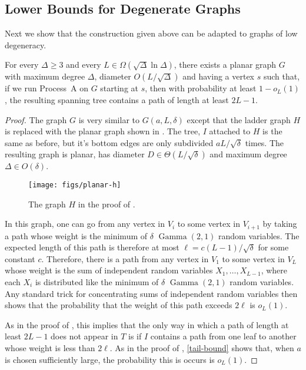 \documentclass[lotsofwhite]{patmorin}
\DeclareMathOperator{\gammarv}{Gamma}
\begin{document}
\subsection{Lower Bounds for Degenerate Graphs}

Next we show that the construction given above can be adapted to graphs
of low degeneracy.

\begin{thm}
  For every $\Delta\ge 3$ and every $L\in\Omega(\sqrt{\Delta}\ln\Delta)$,
  there exists a planar graph $G$ with maximum degree $\Delta$, diameter
  $O(L/\sqrt{\Delta})$ and having a vertex $s$ such that, if we run
  Process~A on $G$ starting at $s$, then with probability at least
  $1-o_L(1)$, the resulting spanning tree contains a path of length at
  least $2L-1$.
\end{thm}

\begin{proof}
  The graph $G$ is very similar to $G(a, L,\delta)$ except that the ladder
  graph $H$ is replaced with the planar graph shown in .
  The tree, $I$ attached to $H$ is the same as before, but it's bottom
  edges are only subdivided $aL/\sqrt{\delta}$ times.  The resulting
  graph is planar, has diameter $D\in\Theta(L/\sqrt{\delta})$ and maximum
  degree $\Delta\in O(\delta)$.

  \begin{figure}
    \begin{center}
      \texttt{[image: figs/planar-h]}
    \end{center}
    \caption{The graph $H$ in the proof of .}
  \end{figure}
 
  In this graph, one can go from any vertex in $V_i$ to some vertex in 
  $V_{i+1}$ by taking a path
  whose weight is the minimum of $\delta$ $\gammarv(2,1)$ random
  variables.  The expected length of this path is therefore at most
  $\ell=c(L-1)/\sqrt{\delta}$ for some constant $c$. Therefore, there is
  a path from any vertex in $V_1$ to some vertex in $V_L$ whose weight is
  the sum of independent random variables $X_1,\ldots,X_{L-1}$, where each
  $X_i$ is distributed like the minimum of $\delta$ $\gammarv(2,1)$ random
  variables. Any standard trick for concentrating sums of independent
  random variables then shows that the probability that the weight of
  this path exceeds $2\ell$ is $o_L(1)$.

  As in the proof of , this implies
  that the only way in which a path of length at least $2L-1$ does not
  appear in $T$ is if $I$ contains a path from one leaf to another whose
  weight is less than $2\ell$.  As in the proof of ,
  \eqref{tail-bound} shows that, when $a$ is chosen sufficiently large,
  the probability this is occurs is $o_L(1)$.
\end{proof}
\end{document}
